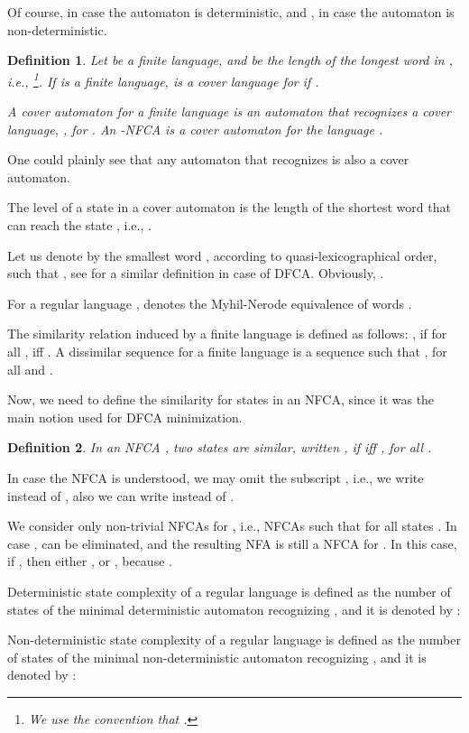 \documentclass[submission,copyright,creativecommons]{eptcs}
\newtheorem{definition}{Definition}
\begin{document}
Of course,  in case the automaton is deterministic, and 
, in case the automaton is non-deterministic.
\begin{definition}
Let  be a finite language, and  be the length of the longest word  in , i.e.,
\footnote{ We use the convention that .}.
If  is a finite language,  is a cover language for  if .

A cover automaton for a finite language  is an automaton that
recognizes a cover language, , for .
An -NFCA  is a cover automaton for the language .
\end{definition}

One could plainly see  that any automaton that recognizes  is also a cover automaton.

The level of a state  in a cover automaton  is
the length of the shortest word that can reach the state , i.e., 
.

Let us denote by  the smallest word , according to quasi-lexicographical order, such that
, see \cite{CoverAutomata} for a similar definition in case of DFCA.
Obviously,  .

For a regular language ,  denotes the Myhil-Nerode equivalence of words \cite{hopcroft79}.

The similarity relation induced by a finite language  is defined as follows\cite{CoverAutomata}:
, if
for all ,  iff .
A dissimilar sequence for a finite language  
is a sequence  such that , for all 
and
 .


Now, we need to define the similarity for states in an NFCA, 
since it was the main notion used for DFCA minimization.

\begin{definition}
In an NFCA , two states  are similar, written ,  if
 iff , 
for all .
\end{definition}

In case the NFCA  is understood, we may omit the subscript , i.e., we 
write  instead of , also we can write  instead of .

We consider only non-trivial NFCAs for , i.e., 
 NFCAs such that  for all states . In case
,  can be eliminated, and the resulting NFA is still a NFCA for .
In this case, if , then  either , or , because .


Deterministic state complexity of a regular language  is defined as the number of states of the minimal 
deterministic automaton recognizing , and it is denoted by :
 
Non-deterministic state complexity of a regular language  is defined as the number of states of the minimal 
non-deterministic automaton recognizing , and it is denoted by :
 
\end{document}
